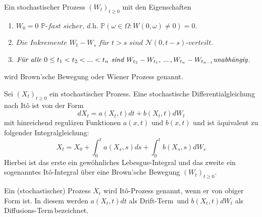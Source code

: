 \begin{Definition}
Ein stochastischer Prozess $\left(W_t\right)_{t\geq0}$ mit den Eigenschaften
\begin{enumerate}
\item $W_0 = 0 \,\,\mathbb{P}\textit{-fast sicher, d.h. } \mathbb{P}\left(\omega \in \Omega : W\left(0,\omega\right) \neq 0 \right) = 0 $.
\item $\textit{Die Inkremente } W_t - W_s \textit{ für } t>s \textit{ sind } \mathcal{N}(0,t-s) \textit{-verteilt}$.
\item $\textit{Für alle } 0\leq t_1 < t_2 < ... < t_n \textit{ sind } W_{t_2} - W_{t_1}, \, ... \, ,W_{t_n}-W_{t_{n-1}} \\ \textit{unabhängig}$.
\end{enumerate}
wird Brown'sche Bewegung oder Wiener Prozess genannt.
\end{Definition}

\begin{Definition} \label{def:ito-Prozess}
Sei $\left(X_t\right)_{t\geq0}$ ein stochastischer Prozess. Eine stochastische Differentialgleichung nach Itô ist von der Form
\begin{equation}
dX_t = a(X_t,t)dt + b(X_t,t)dW_t \label{def:ito-DGL}
\end{equation}
mit hinreichend regulären Funktionen $a(x,t)$ und $b(x,t)$ und ist äquivalent zu folgender Integralgleichung:
\begin{equation}
X_t = X_0 + \int_0^t \! a(X_s,s) ds + \int_0^t \! b(X_s,s)dW_s
\end{equation}
Hierbei ist das erste ein gewöhnliches Lebesgue-Integral und das zweite ein sogenanntes Itô-Integral über eine Brown'sche Bewegung $\left(W_t\right)_{t\geq0}$.
\end{Definition}

Ein (stochastischer) Prozess $X_t$  wird Itô-Prozess genannt, wenn er von obiger Form ist. In diesem werden $a(X_t,t)dt$ als  \glqq Drift-Term\grqq \, und $b(X_t,t)dW_t$ als \glqq Diffusions-Term\grqq \,bezeichnet.


